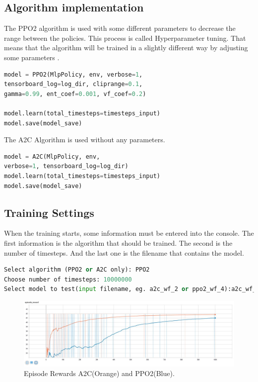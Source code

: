 \documentclass[sigconf]{acmart}
\begin{document}
 \subsection{Algorithm implementation}
 The PPO2 algorithm is used with some different parameters to decrease the range between the policies.
 This process is called Hyperparameter tuning. 
 That means that the algorithm will be trained in a slightly different way by adjusting some parameters \cite[5-7]{schulman2017proximal}.
 
 \begin{lstlisting}[language=Python, caption=PPO2 implementation]
model = PPO2(MlpPolicy, env, verbose=1, 
tensorboard_log=log_dir, cliprange=0.1, 
gamma=0.99, ent_coef=0.001, vf_coef=0.2)

model.learn(total_timesteps=timesteps_input)
model.save(model_save)
 \end{lstlisting}
 \vspace{2.5mm}
 
 The A2C Algorithm is used without any parameters. 
 \begin{lstlisting}[language=Python, caption=A2C implementation]
model = A2C(MlpPolicy, env, 
verbose=1, tensorboard_log=log_dir)
model.learn(total_timesteps=timesteps_input)
model.save(model_save)
 \end{lstlisting}
 \vspace{2.5mm}
 
 \subsection{Training Settings}
 When the training starts, some information must be entered into the console.
 The first information is the algorithm that should be trained.
 The second is the number of timesteps.
 And the last one is the filename that contains the model.
 
\begin{lstlisting}[language=Python, caption=Console output before start]
Select algorithm (PPO2 or A2C only): PPO2
Choose number of timesteps: 10000000
Select model to test(input filename, eg. a2c_wf_2 or ppo2_wf_4):a2c_wf_3
\end{lstlisting}


\begin{figure}
 \centering
  \includegraphics[width=\textwidth]{episode_reward_big} 
  \caption{Episode Rewards A2C(Orange) and PPO2(Blue).}
  \label{fig:reward1}
\end{figure}
 
\end{document}
